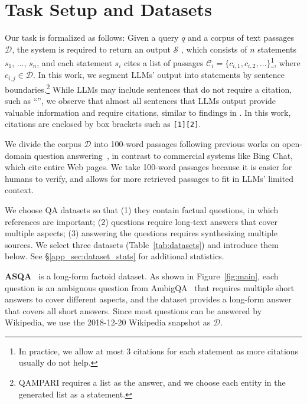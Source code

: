 
\section{Task Setup and Datasets} %




\label{sec:task_def}

Our task is formalized as follows:
Given a query $q$ and a corpus of text passages $\mathcal{D}$,
the system %
is required to return an output $\mathcal{S}$%
, which consists of $n$ statements $s_1$, ..., $s_n$, 
and each statement $s_i$ cites a list of passages $\mathcal{C}_i = \{c_{i,1}, c_{i, 2}, \ldots\}$\footnote{In practice, we allow at most 3 citations for each statement as more citations usually do not help.}, where $c_{i,j}\in \mathcal{D}$. 
In this work,
we segment LLMs' output into statements by sentence boundaries.\footnote{
    QAMPARI requires a list as the answer, and we choose each entity in the generated list as a statement.} 
While LLMs may include sentences that do not require a citation, such as ``'', 
we observe that almost all sentences that LLMs output  provide valuable information and  require citations, similar to findings in
\citet{liu2023evaluating}. 
In this work, citations are enclosed by box brackets such as \texttt{[1][2]}.

We divide the corpus $\mathcal{D}$ into 100-word passages following previous works on open-domain question answering~\cite{karpukhin-etal-2020-dense,petroni-etal-2021-kilt,piktus2021web},
in contrast to
commercial systems like Bing Chat, which cite entire Web pages. %
We take  100-word passages because
it is easier for humans to verify, and %
allows for more retrieved passages to fit in LLMs' limited context.  %


We choose QA datasets so that 
(1) they contain factual questions, in which references are important; 
(2) questions require long-text answers that cover multiple aspects; %
(3) answering the questions  requires synthesizing multiple sources.
We select three datasets %
(Table~\ref{tab:datasets}) and introduce them below. %
See \S\ref{app_sec:dataset_stats} for additional statistics. 

 
\textbf{ASQA}~\cite{stelmakh2022asqa} is a long-form factoid dataset.
As shown in Figure~\ref{fig:main}, 
each question is an ambiguous question from AmbigQA~\cite{min-etal-2020-ambigqa} that requires multiple short answers to cover different aspects, 
and the dataset provides a long-form answer that covers all short answers.
Since most questions can be answered by Wikipedia, we use the 2018-12-20 Wikipedia snapshot as $\mathcal{D}$.  


